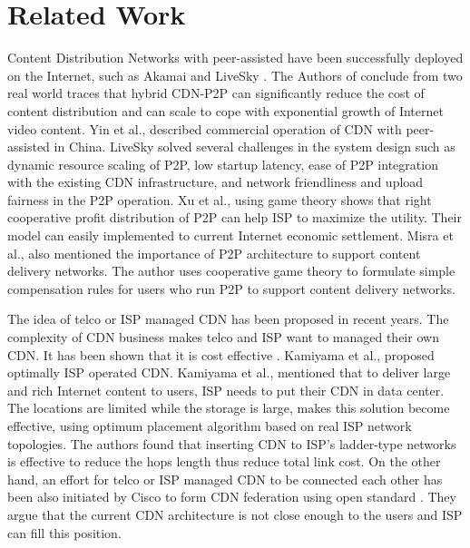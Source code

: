 \documentclass[paper]{ieice}
\begin{document}
\section{Related Work} 
Content Distribution Networks with peer-assisted have been successfully deployed on the Internet, such as Akamai \cite{Huang:2008:UHC:1496046.1496064} and LiveSky \cite{Yin:2010:LEC:1823746.1823750}.
The Authors of \cite{Huang:2008:UHC:1496046.1496064} conclude from two real world traces  that hybrid CDN-P2P can significantly reduce the cost of content distribution and can scale to cope with exponential growth of Internet video content.
Yin et al., \cite{Yin:2010:LEC:1823746.1823750} described commercial operation of CDN with peer-assisted in China.   
LiveSky solved several challenges in the system design such as dynamic resource scaling of P2P, low startup latency, ease of P2P integration with the existing CDN infrastructure, and network friendliness and upload fairness in the P2P operation. 
Xu et al.,\cite{DBLP:journals/corr/abs-1212-4915} using game theory shows that right cooperative profit distribution of P2P can help ISP to maximize the utility. 
Their model can easily implemented to current Internet economic settlement.
Misra et al.,\cite{Misra:2010:IPS:1811099.1811064} also mentioned the importance of P2P architecture to support content delivery networks. 
The author uses cooperative game theory to formulate simple compensation rules for users who run P2P to support content delivery networks.  

The idea of telco or ISP managed CDN has been proposed in recent years.  
The complexity of CDN business makes telco and ISP want to managed their own CDN.
It has been shown that it is cost effective \cite{federation}\cite{norton2011internet}. 
Kamiyama et al., \cite{NoriakiKAMIYAMA2013} proposed optimally ISP operated CDN. 
Kamiyama et al., mentioned that to deliver large and rich Internet content to users, ISP needs to put their CDN in data center.
The locations are limited while the storage is large, makes this solution become effective, using optimum placement algorithm based on real ISP network topologies.
The authors found that inserting CDN to ISP's ladder-type networks is effective to reduce the hops length thus reduce total link cost. 
On the other hand, an effort for telco or ISP managed CDN to be connected each other has been also initiated by Cisco to form CDN federation \cite{federation} using open standard \cite{cdni}.
They argue that the current CDN architecture is not close enough to the users and ISP can fill this position.   
\end{document}

